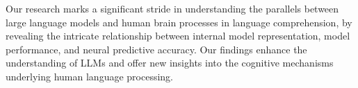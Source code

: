 Our research marks a significant stride in understanding the parallels between large language models and human brain processes in language comprehension, by revealing the intricate relationship between internal model representation, model performance, and neural predictive accuracy. Our findings enhance the understanding of LLMs and offer new insights into the cognitive mechanisms underlying human language processing. 




